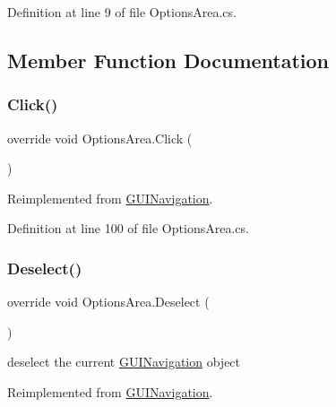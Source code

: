Definition at line 9 of file Options\+Area.\+cs.



\subsection{Member Function Documentation}
\mbox{\label{class_options_area_a1ee78382652a273de4911c8a2894ee36}} 
\subsubsection{\texorpdfstring{Click()}{Click()}}
{\footnotesize\ttfamily override void Options\+Area.\+Click (\begin{DoxyParamCaption}{ }\end{DoxyParamCaption})\hspace{0.3cm}{\ttfamily [virtual]}}



Reimplemented from \mbox{\hyperlink{class_g_u_i_navigation_a175178a8bf2832e74c13f83bf8e8f714}{G\+U\+I\+Navigation}}.



Definition at line 100 of file Options\+Area.\+cs.

\mbox{\label{class_options_area_abecd9cd9d7c96ae63dde5110cce7c364}} 
\subsubsection{\texorpdfstring{Deselect()}{Deselect()}}
{\footnotesize\ttfamily override void Options\+Area.\+Deselect (\begin{DoxyParamCaption}{ }\end{DoxyParamCaption})\hspace{0.3cm}{\ttfamily [virtual]}}



deselect the current \mbox{\hyperlink{class_g_u_i_navigation}{G\+U\+I\+Navigation}} object 



Reimplemented from \mbox{\hyperlink{class_g_u_i_navigation_a98563f06446b45814ff78978b472e948}{G\+U\+I\+Navigation}}.



